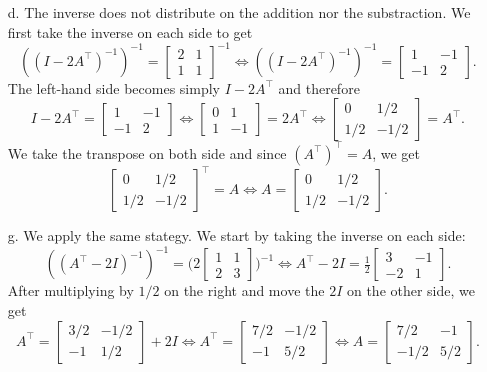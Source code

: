 \documentclass[12pt]{article}
\begin{document}
	\begin{enumerate}
		\item[d.] The inverse does not distribute on the addition nor the substraction. We first take the inverse on each side to get
			\[
				( (I - 2A^\top)^{-1})^{-1} = \begin{bmatrix} 2 & 1 \\ 1 & 1 \end{bmatrix}^{-1} \iff ((I - 2A^\top)^{-1})^{-1} = \begin{bmatrix} 1 & -1 \\ -1 & 2 \end{bmatrix}.
			\]
		The left-hand side becomes simply $I - 2A^\top$ and therefore
			\[
				I - 2A^\top = \begin{bmatrix} 1 & -1 \\ -1 & 2 \end{bmatrix} \iff \begin{bmatrix} 0 & 1 \\ 1 & -1 \end{bmatrix} = 2A^\top \iff \begin{bmatrix} 0 & 1/2 \\ 1/2 & -1/2 \end{bmatrix} = A^\top .
			\]
		We take the transpose on both side and since $(A^\top)^\top = A$, we get
			\[
				\begin{bmatrix} 0 & 1/2 \\ 1/2 & -1/2 \end{bmatrix}^\top = A \iff A = \begin{bmatrix} 0 & 1/2 \\ 1/2 & -1/2 \end{bmatrix} .
			\]

		\item[g.] We apply the same stategy. We start by taking the inverse on each side:
			\[
				( (A^\top - 2I)^{-1})^{-1} = \Big( 2 \begin{bmatrix} 1 & 1 \\ 2 & 3 \end{bmatrix} \Big)^{-1} \iff A^\top - 2I = \tfrac{1}{2} \begin{bmatrix} 3 & -1 \\ -2 & 1 \end{bmatrix} .
			\]
		After multiplying by $1/2$ on the right and move the $2I$ on the other side, we get
			\[
				A^\top = \begin{bmatrix} 3/2 & -1/2 \\ -1 & 1/2 \end{bmatrix} + 2I \iff A^\top = \begin{bmatrix} 7/2 & -1/2 \\ -1 & 5/2 \end{bmatrix} \iff A = \begin{bmatrix} 7/2 & -1 \\ -1/2 & 5/2 \end{bmatrix} .
			\]
	\end{enumerate}
\end{document}
